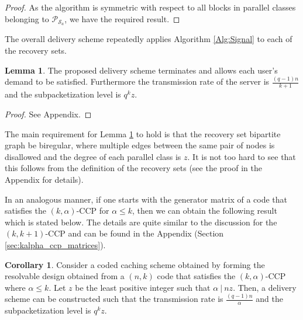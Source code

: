 \documentclass[journal,twocolumn]{IEEEtran}
\theoremstyle{definition}
\newtheorem{lemma}{Lemma}
\newtheorem{corollary}{Corollary}
\newcommand{\calP}{\mathcal{P}}
\newcommand{\calS}{\mathcal{S}}
\newcommand{\calT}{\mathcal{T}}
\newcommand{\aditya}[1]{\marginpar{+}{\bf Aditya's remark}: {\em #1}}
\newcommand{\litang}[1]{\marginpar{+}{\bf Li's remark}: {\em #1}}
\begin{document}
\begin{proof}
    As the algorithm is symmetric with respect to all blocks in parallel classes belonging to $\calP_{\calS_a}$, we have the required result.
\end{proof}


The overall delivery scheme  repeatedly applies Algorithm \ref{Alg:Signal} to each of the recovery sets.
\begin{lemma}
	\label{lemma:delivery}
	The proposed delivery scheme terminates and allows each user's demand to be satisfied. Furthermore the transmission rate of the server is $\frac{(q-1)n}{k+1}$ and the subpacketization level is $q^kz$.
\end{lemma}
\begin{proof}
See Appendix.
\end{proof}
The main requirement for Lemma \ref{lemma:delivery} to hold is that the recovery set bipartite graph be biregular, where multiple edges between the same pair of nodes is disallowed and the degree of each parallel class is $z$. It is not too hard to see that this follows from the definition of the recovery sets (see the proof in the Appendix for details).

In an analogous manner, if one starts with the generator matrix of a code that satisfies the $(k,\alpha)$-CCP for $\alpha \leq k$, then we can obtain the following result which is stated below. The details are quite similar to the discussion for the $(k,k+1)$-CCP and can be found in the Appendix (Section \ref{sec:kalpha_ccp_matrices}).
\begin{corollary}
Consider a coded caching scheme obtained by forming the resolvable design obtained from a $(n,k)$ code that satisfies the $(k,\alpha)$-CCP where $\alpha \leq k$. Let $z$ be the least positive integer such that $\alpha ~|~nz$. Then, a delivery scheme can be constructed such that the transmission rate is $\frac{(q-1)n}{\alpha}$ and the subpacketization level is $q^kz$. %
\end{corollary}
\end{document}
